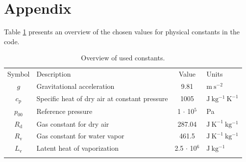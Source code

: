 \documentclass[gmd]{copernicus}
\begin{document}
\section{Appendix}
Table \ref{tab:constants} presents an overview of the chosen values for physical constants in the code.
\begin{table}[t]
\caption{Overview of used constants.}\label{tab:constants}
\begin{tabular}{clcl}
\tophline
Symbol & Description & Value & Units \\
\middlehline
$g$ & Gravitational acceleration & 9.81 & $\mathrm{m~s^{-2}}$\\
$c_\mathrm{p}$ & Specific heat of dry air at constant pressure & 1005 & $\mathrm{J~kg^{-1}~K^{-1}}$\\
$p_\mathrm{00}$ & Reference pressure & 1 $\cdot$ 10$^5$ & Pa\\
$R_\mathrm{d}$ & Gas constant for dry air & 287.04 & $\mathrm{J~K^{-1}~kg^{-1}}$\\
$R_\mathrm{v}$ & Gas constant for water vapor & 461.5 & $\mathrm{J~K^{-1}~kg^{-1}}$\\
$L_\mathrm{v}$ & Latent heat of vaporization & 2.5 $\cdot$ 10$^6$ & $\mathrm{J~kg^{-1}}$\\
\bottomhline
\end{tabular}
\end{table}

\iffalse
\end{document}
